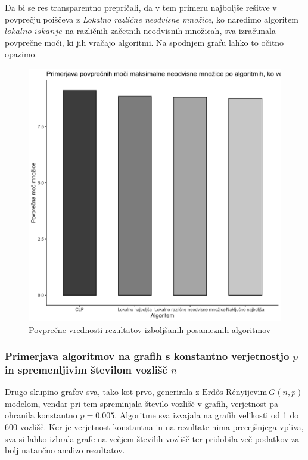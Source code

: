 \documentclass[a4paper, 12pt]{article}
\begin{document}
\newpage
\noindent Da bi se res transparentno prepričali, da v tem primeru najboljše rešitve v povprečju poiščeva z \textit{Lokalno različne neodvisne množice}, ko naredimo algoritem $lokalno\_iskanje$
na različnih začetnih neodvisnih množicah, sva izračunala povprečne moči, ki jih vračajo algoritmi. Na spodnjem grafu lahko to očitno opazimo.
\begin{figure}[h!]
	\begin{center}
		\includegraphics[scale=0.11]{R_koda/pon-povpmoc-maxi.png}
		\caption{Povprečne vrednosti rezultatov izboljšanih posameznih algoritmov}
	\end{center}
\end{figure}


\subsubsection{Primerjava algoritmov na grafih s konstantno verjetnostjo $p$ in spremenljivim številom vozlišč $n$}

Drugo skupino grafov sva, tako kot prvo, generirala z $\text{Erdős-Rényijevim}\ G(n, p)$ modelom, vendar pri tem spreminjala število vozlišč v grafih, verjetnost pa ohranila konstantno $p=0.005$.
Algoritme sva izvajala na grafih velikosti od 1 do 600 vozlišč. Ker je verjetnost konstantna in na rezultate nima precejšnjega vpliva, sva si lahko izbrala grafe na večjem številih vozlišč ter pridobila več podatkov za bolj natančno analizo rezultatov.\\
\end{document}
